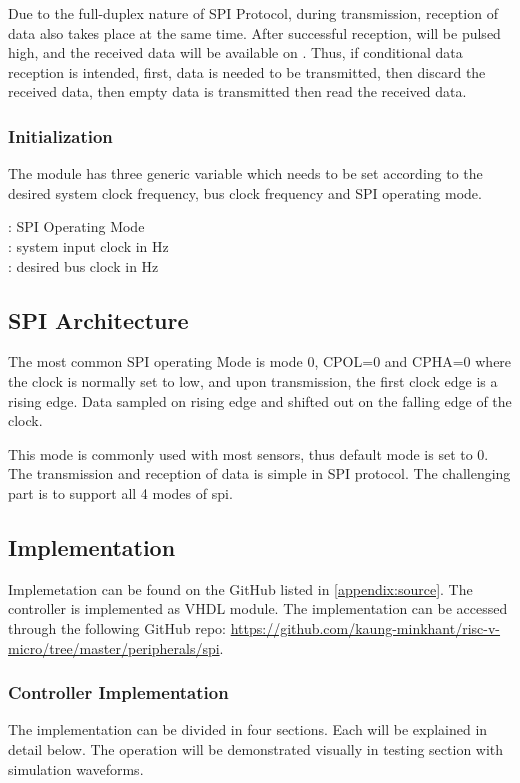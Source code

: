 Due to the full-duplex nature of SPI Protocol, during transmission, reception of data also takes place at the same time. After successful reception,  will be pulsed high, and the received data will be available on . Thus, if conditional data reception is intended, first, data is needed to be transmitted, then discard the received data, then empty data is transmitted then read the received data.

\subsubsection{Initialization}
The module has three generic variable which needs to be set according to the desired system clock frequency, bus clock frequency and SPI operating mode.

\noindent {} : SPI Operating Mode\\
 : system input clock in Hz \\
 : desired bus clock in Hz

\subsection{SPI Architecture}
The most common SPI operating Mode is mode 0, CPOL=0 and CPHA=0 where the clock is normally set to low, and upon transmission, the first clock edge is a rising edge. Data sampled on rising edge and shifted out on the falling edge of the clock.


This mode is commonly used with most sensors, thus default mode is set to 0. The transmission and reception of data is simple in SPI protocol. The challenging part is to support all 4 modes of spi. 

\newpage
\subsection{Implementation}
Implemetation can be found on the GitHub listed in \ref{appendix:source}.
The controller is implemented as VHDL module. The implementation can be accessed through the following GitHub repo: \url{https://github.com/kaung-minkhant/risc-v-micro/tree/master/peripherals/spi}.

\subsubsection{Controller Implementation}
The implementation can be divided in four sections. Each will be explained in detail below. The operation will be demonstrated visually in testing section with simulation waveforms.

